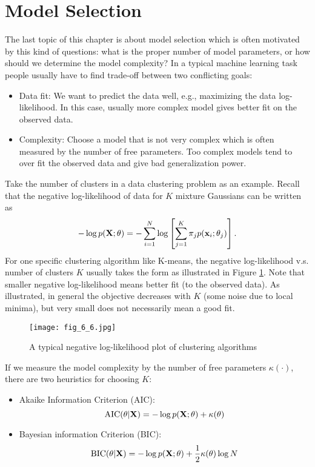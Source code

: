 \documentclass[../book-template.tex]{subfiles}
\begin{document}
\section{Model Selection}
The last topic of this chapter is about model selection which is often motivated by this kind of questions: what is the proper number of model parameters, or how should we determine the model complexity? In a typical machine learning task people usually have to find trade-off between two conflicting goals:
\begin{itemize}
	\item Data fit: We want to predict the data well, e.g., maximizing the data log-likelihood. In this case, usually more complex model gives better fit on the observed data.
	\item Complexity: Choose a model that is not very complex which is often measured by the number of free parameters. Too complex models tend to over fit the observed data and give bad generalization power.
\end{itemize}
Take the number of clusters in a data clustering problem as an example. Recall that the negative log-likelihood of data for $K$ mixture Gaussians can be written as
\begin{equation*}
	-\log p({\bf X};\theta)=-\sum_{i=1}^{N}\log \left[\sum_{j=1}^{K}\pi_jp({\bf x}_i;\theta_j)\right].
\end{equation*}
For one specific clustering algorithm like K-means, the negative log-likelihood v.s. number of clusters $K$ usually takes the form as illustrated in Figure \ref{fig_6_6}. Note that smaller negative log-likelihood means better fit (to the observed data). As illustrated, in general the objective decreases with $K$ (some noise due to local minima), but very small does not necessarily mean a good fit. 
\begin{figure}[h] 
	\centering 
	\texttt{[image: fig\_6\_6.jpg]} 
	\caption{A typical negative log-likelihood plot of clustering algorithms}\label{fig_6_6}
\end{figure}
\par If we measure the model complexity by the number of free parameters $\kappa(\cdot)$, there are two heuristics for choosing $K$:
\begin{itemize}
	\item Akaike Information Criterion (AIC):
	\begin{equation*}
		{\rm AIC}(\theta|{\bf X})=-\log p({\bf X};\theta)+\kappa(\theta)
	\end{equation*}
	\item Bayesian information Criterion (BIC):
	\begin{equation*}
		{\rm BIC}(\theta|{\bf X})=-\log p({\bf X};\theta)+\frac{1}{2}\kappa(\theta)\log N
	\end{equation*}
\end{itemize}
\end{document}
